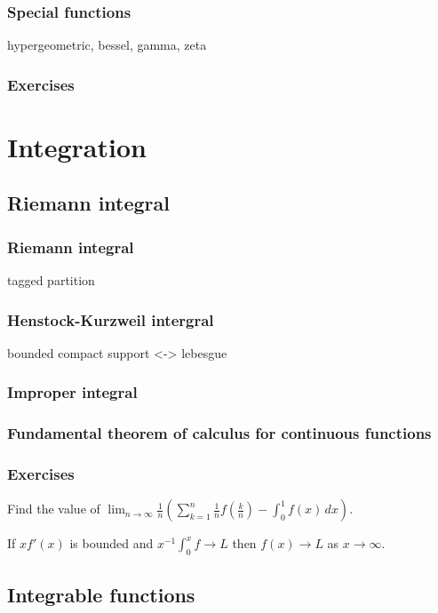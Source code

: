\documentclass{../note}
\begin{document}
\section{Special functions}
hypergeometric, bessel, gamma, zeta

\section*{Exercises}



\part{Integration}

\chapter{Riemann integral}

\section{Riemann integral}
tagged partition
\section{Henstock-Kurzweil intergral}
bounded compact support <-> lebesgue
\section{Improper integral}
\section{Fundamental theorem of calculus for continuous functions}

\section*{Exercises}
\begin{prb}
Find the value of $\lim_{n\to\infty}\frac1n\left(\sum_{k=1}^n\frac1nf\left(\frac kn\right)-\int_0^1f(x)\,dx\right)$.
\end{prb}

\begin{prb}
If $xf'(x)$ is bounded and $x^{-1}\int_0^xf\to L$ then $f(x)\to L$ as $x\to\infty$.
\end{prb}


\chapter{Integrable functions}
\end{document}
